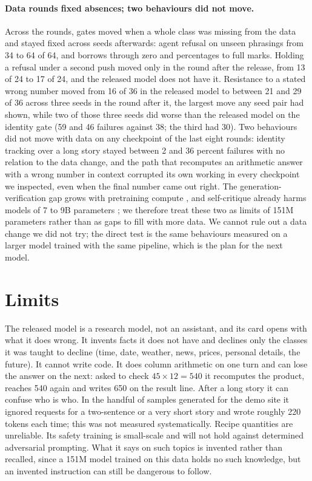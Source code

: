 \documentclass[11pt]{article}
\begin{document}
\paragraph{Data rounds fixed absences; two behaviours did not move.} Across the rounds, gates moved when a whole class was missing from the data and stayed fixed across seeds afterwards: agent refusal on unseen phrasings from 34 to 64 of 64, and borrows through zero and percentages to full marks. Holding a refusal under a second push moved only in the round after the release, from 13 of 24 to 17 of 24, and the released model does not have it. Resistance to a stated wrong number moved from 16 of 36 in the released model to between 21 and 29 of 36 across three seeds in the round after it, the largest move any seed pair had shown, while two of those three seeds did worse than the released model on the identity gate (59 and 46 failures against 38; the third had 30). Two behaviours did not move with data on any checkpoint of the last eight rounds: identity tracking over a long story stayed between 2 and 36 percent failures with no relation to the data change, and the path that recomputes an arithmetic answer with a wrong number in context corrupted its own working in every checkpoint we inspected, even when the final number came out right. The generation-verification gap grows with pretraining compute \cite{gap}, and self-critique already harms models of 7 to 9B parameters \cite{wrongreasons}; we therefore treat these two as limits of 151M parameters rather than as gaps to fill with more data. We cannot rule out a data change we did not try; the direct test is the same behaviours measured on a larger model trained with the same pipeline, which is the plan for the next model.

\section{Limits}\label{sec:limits}
The released model is a research model, not an assistant, and its card opens with what it does wrong. It invents facts it does not have and declines only the classes it was taught to decline (time, date, weather, news, prices, personal details, the future). It cannot write code. It does column arithmetic on one turn and can lose the answer on the next: asked to check $45\times12=540$ it recomputes the product, reaches 540 again and writes 650 on the result line. After a long story it can confuse who is who. In the handful of samples generated for the demo site it ignored requests for a two-sentence or a very short story and wrote roughly 220 tokens each time; this was not measured systematically. Recipe quantities are unreliable. Its safety training is small-scale and will not hold against determined adversarial prompting. What it says on such topics is invented rather than recalled, since a 151M model trained on this data holds no such knowledge, but an invented instruction can still be dangerous to follow.
\end{document}
